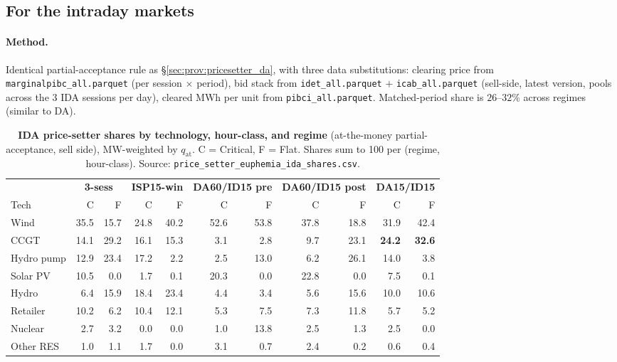 \documentclass[11pt,a4paper]{article}
\newcommand{\code}[1]{\nolinkurl{#1}}
\begin{document}
\subsection{For the intraday markets}\label{sec:prov:pricesetter_ida}

\paragraph{Method.} Identical partial-acceptance rule as \S\ref{sec:prov:pricesetter_da}, with three data substitutions: clearing price from \code{marginalpibc_all.parquet} (per session $\times$ period), bid stack from \code{idet_all.parquet} $+$ \code{icab_all.parquet} (sell-side, latest version, pools across the 3 IDA sessions per day), cleared MWh per unit from \code{pibci_all.parquet}. Matched-period share is $26$--$32\%$ across regimes (similar to DA).

\begin{table}[H]
\centering\scriptsize
\caption{\textbf{IDA price-setter shares by technology, hour-class, and regime} (at-the-money partial-acceptance, sell side), MW-weighted by $q_{\text{at}}$. C = Critical, F = Flat. Shares sum to 100 per (regime, hour-class). Source: \code{price_setter_euphemia_ida_shares.csv}.}
\label{tab:pricesetter_ida}
\setlength{\tabcolsep}{4pt}
\begin{tabular}{l r r r r r r r r r r}
\toprule
 & \multicolumn{2}{c}{\textbf{3-sess}} & \multicolumn{2}{c}{\textbf{ISP15-win}} & \multicolumn{2}{c}{\textbf{DA60/ID15 pre}} & \multicolumn{2}{c}{\textbf{DA60/ID15 post}} & \multicolumn{2}{c}{\textbf{DA15/ID15}} \\
\cmidrule(lr){2-3}\cmidrule(lr){4-5}\cmidrule(lr){6-7}\cmidrule(lr){8-9}\cmidrule(lr){10-11}
Tech       & C & F & C & F & C & F & C & F & C & F \\
\midrule
Wind        & 35.5 & 15.7 & 24.8 & 40.2 & 52.6 & 53.8 & 37.8 & 18.8 & 31.9 & 42.4 \\
CCGT        & 14.1 & 29.2 & 16.1 & 15.3 &  3.1 &  2.8 &  9.7 & 23.1 & \textbf{24.2} & \textbf{32.6} \\
Hydro pump  & 12.9 & 23.4 & 17.2 &  2.2 &  2.5 & 13.0 &  6.2 & 26.1 & 14.0 &  3.8 \\
Solar PV    & 10.5 &  0.0 &  1.7 &  0.1 & 20.3 &  0.0 & 22.8 &  0.0 &  7.5 &  0.1 \\
Hydro       &  6.4 & 15.9 & 18.4 & 23.4 &  4.4 &  3.4 &  5.6 & 15.6 & 10.0 & 10.6 \\
Retailer    & 10.2 &  6.2 & 10.4 & 12.1 &  5.3 &  7.5 &  7.3 & 11.8 &  5.7 &  5.2 \\
Nuclear     &  2.7 &  3.2 &  0.0 &  0.0 &  1.0 & 13.8 &  2.5 &  1.3 &  2.5 &  0.0 \\
Other RES   &  1.0 &  1.1 &  1.7 &  0.0 &  3.1 &  0.7 &  2.4 &  0.2 &  0.6 &  0.4 \\
\bottomrule
\end{tabular}
\end{table}
\end{document}
